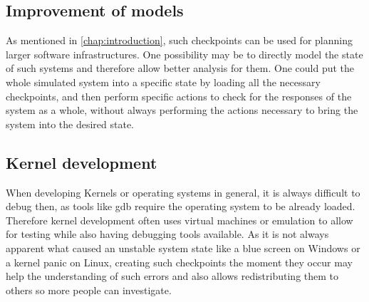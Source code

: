 \subsection{Improvement of models}
As mentioned in \autoref{chap:introduction},
such checkpoints can be used for planning larger software infrastructures.
One possibility may be to directly model the state of such systems
and therefore allow better analysis for them.
One could put the whole simulated system into a specific state by loading all the necessary checkpoints,
and then perform specific actions to check for the responses of the system as a whole,
without always performing the actions necessary to bring the system into the desired state.

\subsection{Kernel development}
When developing Kernels or operating systems in general,
it is always difficult to debug then, as tools like gdb require the operating system to be already loaded.
Therefore kernel development often uses virtual machines or emulation
to allow for testing while also having debugging tools available.
As it is not always apparent what caused an unstable system state
like a blue screen on Windows or a kernel panic on Linux,
creating such checkpoints the moment they occur may help the understanding of such errors
and also allows redistributing them to others so more people can investigate.
